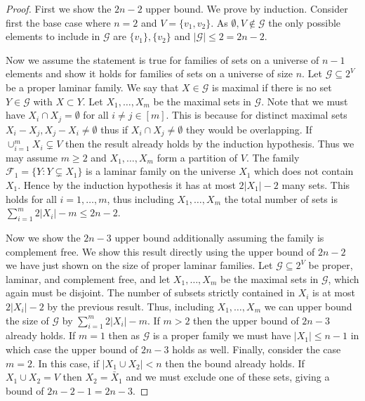 \documentclass[10pt,a4paper]{article}
\newcommand{\Fcal}{\mathcal{F}}
\newcommand{\Gcal}{\mathcal{G}}
\newcommand{\1}{\mathbf{1}}
\theoremstyle{definition}
\begin{document}
\begin{proof}
First we show the $2n-2$ upper bound.
We prove by induction.  Consider first the base case where $n=2$ and $V = \{v_1, v_2\}$.  As $\emptyset, V \not \in \Gcal$ the only possible elements to include in $\Gcal$
are $\{v_1\}, \{v_2\}$ and $|\Gcal| \le 2 = 2n-2$.

Now we assume the statement is true for families of sets on a universe of $n-1$ elements and show it holds for families of sets on a universe of size $n$.  Let
$\Gcal \subseteq 2^{V}$ be a proper laminar family.  We say that $X \in \Gcal$ is maximal
if there is no set $Y \in \Gcal$ with $X \subset Y$.  Let $X_1, \ldots, X_m$ be the maximal sets in $\Gcal$.  Note that we must have
$X_i \cap X_j = \emptyset$ for all $i\ne j \in [m]$.  This is because for distinct maximal sets $X_i - X_j, X_j - X_i \ne \emptyset$ thus if
$X_i \cap X_j \ne \emptyset$ they would be overlapping.  If $\cup_{i=1}^m X_i \subsetneq V$ then the result already holds by the induction hypothesis.
Thus we may assume $m \ge 2$ and $X_1, \ldots, X_m$ form a partition of $V$.
The family $\Fcal_1 = \{Y : Y \subsetneq X_1\}$ is a laminar family on the universe $X_1$ which does not contain $X_1$.  Hence by the induction hypothesis it has at most $2|X_1|-2$ many sets.  This holds for all
$i =1, \ldots, m$, thus including $X_1, \ldots, X_m$ the total number of sets is $\sum_{i=1}^m 2|X_i| - m \le 2n-2$.

Now we show the $2n-3$ upper bound additionally assuming the family is complement free.  We show this result directly using the upper bound
of $2n-2$ we have just shown on the size of proper laminar families.  Let $\Gcal \subseteq 2^{V}$ be proper, laminar, and complement free,
and let $X_1, \ldots, X_m$ be the maximal sets in $\Gcal$, which again must be disjoint.  The number of subsets strictly contained in $X_i$ is at most $2|X_i| - 2$ by the previous result.  Thus, including $X_1, \ldots, X_m$
we can upper bound the size of $\Gcal$ by $\sum_{i=1}^m 2|X_i| - m$.  If $m > 2$ then the upper bound of $2n-3$ already holds.  If $m=1$ then as $\Gcal$ is
a proper family we must have $|X_1| \le n-1$ in which case the upper bound of $2n-3$ holds as well.  Finally, consider the case $m=2$.  In this case, if $|X_1 \cup X_2| < n$ then
the bound already holds.  If $X_1 \cup X_2 = V$ then $X_2 = \bar{X}_1$ and we must exclude one of these sets, giving a bound of $2n-2-1 = 2n-3$.
\end{proof}
\end{document}
